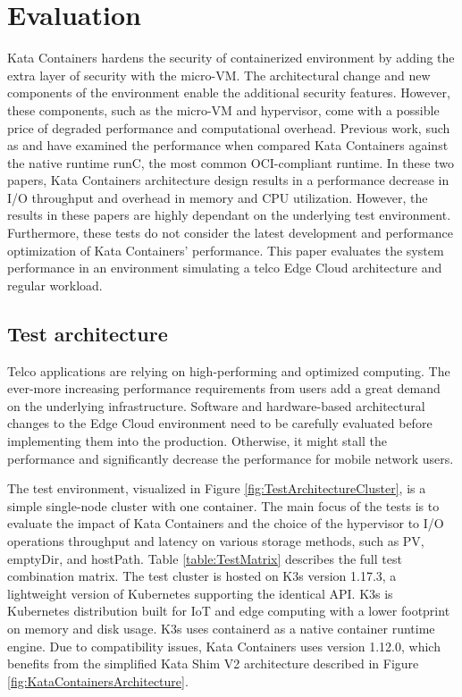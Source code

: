 \chapter{Evaluation}
\label{chapter:evaluation}

Kata Containers hardens the security of containerized environment by adding the extra layer of security with the micro-VM. The architectural change and new components of the environment enable the additional security features. However, these components, such as the micro-VM and hypervisor, come with a possible price of degraded performance and computational overhead. Previous work, such as \cite{EverartsdeVelp2020} and \cite{Kumar2020} have examined the performance when compared Kata Containers against the native runtime runC, the most common OCI-compliant runtime. In these two papers, Kata Containers architecture design results in a performance decrease in I/O throughput and overhead in memory and CPU utilization. However, the results in these papers are highly dependant on the underlying test environment. Furthermore, these tests do not consider the latest development and performance optimization of Kata Containers' performance. This paper evaluates the system performance in an environment simulating a telco Edge Cloud architecture and regular workload.

\section{Test architecture}
\label{section:test_architecture}

Telco applications are relying on high-performing and optimized computing. The ever-more increasing performance requirements from users add a great demand on the underlying infrastructure. Software and hardware-based architectural changes to the Edge Cloud environment need to be carefully evaluated before implementing them into the production. Otherwise, it might stall the performance and significantly decrease the performance for mobile network users.

The test environment, visualized in Figure \ref{fig:TestArchitectureCluster}, is a simple single-node cluster with one container. The main focus of the tests is to evaluate the impact of Kata Containers and the choice of the hypervisor to I/O operations throughput and latency on various storage methods, such as PV, emptyDir, and hostPath. Table \ref{table:TestMatrix} describes the full test combination matrix. The test cluster is hosted on K3s \cite{K3s} version 1.17.3, a lightweight version of Kubernetes supporting the identical API. K3s is Kubernetes distribution built for IoT and edge computing with a lower footprint on memory and disk usage. K3s uses containerd as a native container runtime engine. Due to compatibility issues, Kata Containers uses version 1.12.0, which benefits from the simplified Kata Shim V2 \cite{KataContainersArchitecture} architecture described in Figure \ref{fig:KataContainersArchitecture}.

